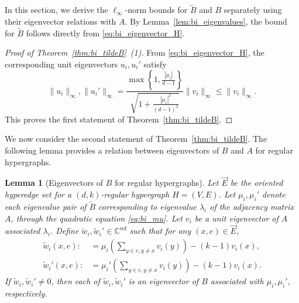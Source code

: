 \documentclass[11pt,reqno]{amsart}
\newtheorem{lemma}[theorem]{Lemma}
\theoremstyle{definition}
\begin{document}
{In this section, we derive the $\ell_\infty$-norm bounds for $\widetilde{B}$ and $B$ separately using their eigenvector relations with $A$. By Lemma~\ref{lem:bi_eigenvalues}, the bound for $\widetilde{B}$ follows directly from \eqref{eq:bi_eigenvector_H}.}

\begin{proof}[Proof of Theorem~\ref{thm:bi_tildeB}~(1)]
      From \eqref{eq:bi_eigenvector_H},  the corresponding unit eigenvectors $u_i, u_i'$ {satisfy} 
\[ \|u_i\|_{\infty}, \|u_i'\|_{\infty}= \frac{\max \left\{ 1, \frac{|\mu_i|}{d-1}\right\}}{\sqrt{1+ \frac{|\mu_i|^2}{(d-1)^2}}} \|v_i\|_{\infty}\leq \|v_i\|_{\infty}. \]
This proves the first statement of Theorem~\ref{thm:bi_tildeB}.
\end{proof}
  
We now consider the second statement of Theorem~\ref{thm:bi_tildeB}. The following lemma provides a relation between eigenvectors of $B$ and $A$ for regular hypergraphs.

\begin{lemma}[Eigenvectors of $B$ for regular hypergraphs]\label{lem:eigenvector_hypergraph}
{Let}  $\vec{E}$ be the oriented hyperedge set for a $(d,k)$-regular hypergraph $H=(V,E)$. Let $\mu_i, \mu_i'$ denote each eigenvalue pair of $\tilde B$ corresponding to eigenvalue $\lambda_i$ of the adjacency matrix $A$, through the quadratic equation \eqref{eq:bi_mu}. Let $v_i$ be a unit eigenvector of $A$ associated $\lambda_i$. Define $\tilde{w}_i, \tilde{w}_i'\in \mathbb C^{nd}$ such that for any $(x,e)\in \vec{E}$,
\begin{align} \label{eq:w_H}
    \tilde w_i(x,e) :&=\mu_i \left(\sum_{y\in e, y\not=x} v_i(y)\right)-(k-1) v_i(x),\\  \tilde w_i'(x,e) :&=\mu_i' \left(\sum_{y\in e, y\not=x} v_i(y)\right)- (k-1)v_i(x).
\end{align}
{If} $\tilde w_i, \tilde{w}_i'\not=0$, {then  each of} $\tilde w_i, \tilde{w}_i'$ is an eigenvector of $B$ associated with $\mu_i,\mu_i'$, respectively. 
\end{lemma}
\end{document}
